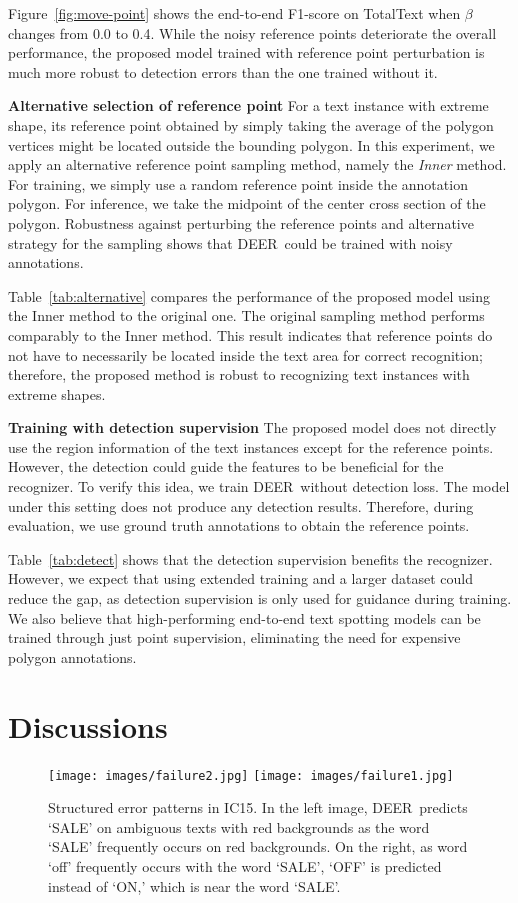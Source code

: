 \documentclass[10pt,twocolumn,letterpaper]{article}
\newcommand{\Figure}[1]{Figure~\ref{fig:#1}}
\newcommand{\Table}[1]{Table~\ref{tab:#1}}
\newcommand{\methodname}[0]{DEER}
\begin{document}
\Figure{move-point} shows the end-to-end F1-score on TotalText when \(\beta\) changes from 0.0 to 0.4. While the noisy reference points deteriorate the overall performance, the proposed model trained with reference point perturbation is much more robust to detection errors than the one trained without it.

\noindent\textbf{Alternative selection of reference point} 
For a text instance with extreme shape, its reference point obtained by simply taking the average of the polygon vertices might be located outside the bounding polygon.
In this experiment, we apply an alternative reference point sampling method, namely the \textit{Inner} method. For training, we simply use a random reference point inside the annotation polygon. For inference, we take the midpoint of the center cross section of the polygon.
Robustness against perturbing the reference points and alternative strategy for the sampling shows that \methodname~could be trained with noisy annotations.

\Table{alternative} compares the performance of the proposed model using the Inner method to the original one. The original sampling method performs comparably to the Inner method. This result indicates that reference points do not have to necessarily be located inside the text area for correct recognition; therefore, the proposed method is robust to recognizing text instances with extreme shapes.

\noindent\textbf{Training with detection supervision}
The proposed model does not directly use the region information of the text instances except for the reference points. However, the detection could guide the features to be beneficial for the recognizer. 
To verify this idea, we train \methodname~without detection loss. The model under this setting does not produce any detection results. Therefore, during evaluation, we use ground truth annotations to obtain the reference points.

\Table{detect} shows that the detection supervision benefits the recognizer. However, we expect that using extended training and a larger dataset could reduce the gap, as detection supervision is only used for guidance during training. We also believe that high-performing end-to-end text spotting models can be trained through just point supervision, eliminating the need for expensive polygon annotations.


 
\section{Discussions}
\begin{figure}[t]
  \centering
\texttt{[image: images/failure2.jpg]}
    \texttt{[image: images/failure1.jpg]}
   \caption{Structured error patterns in IC15. In the left image, \methodname~predicts `SALE' on ambiguous texts with red backgrounds as the word `SALE' frequently occurs on red backgrounds. On the right, as word `off' frequently occurs with the word `SALE', `OFF' is predicted instead of `ON,' which is near the word `SALE'.}
    \label{fig:potential}
\end{figure}
\end{document}
